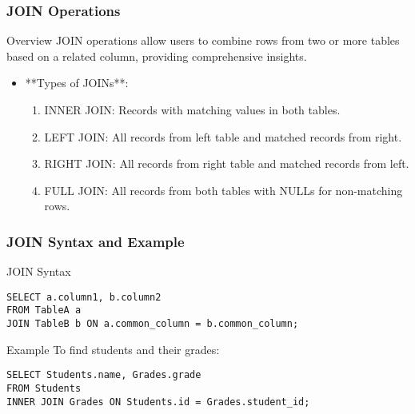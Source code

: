 \documentclass[aspectratio=169]{beamer}
\begin{document}
\begin{frame}[fragile]
    \frametitle{JOIN Operations}
    \begin{block}{Overview}
        JOIN operations allow users to combine rows from two or more tables based on a related column, providing comprehensive insights.
    \end{block}

    \begin{itemize}
        \item **Types of JOINs**:
        \begin{enumerate}
            \item INNER JOIN: Records with matching values in both tables.
            \item LEFT JOIN: All records from left table and matched records from right.
            \item RIGHT JOIN: All records from right table and matched records from left.
            \item FULL JOIN: All records from both tables with NULLs for non-matching rows.
        \end{enumerate}
    \end{itemize}
\end{frame}

\begin{frame}[fragile]
    \frametitle{JOIN Syntax and Example}
    \begin{block}{JOIN Syntax}
        \begin{verbatim}
SELECT a.column1, b.column2
FROM TableA a
JOIN TableB b ON a.common_column = b.common_column;
        \end{verbatim}
    \end{block}

    \begin{block}{Example}
        To find students and their grades:
        \begin{verbatim}
SELECT Students.name, Grades.grade
FROM Students
INNER JOIN Grades ON Students.id = Grades.student_id;
        \end{verbatim}
    \end{block}
\end{frame}
\end{document}
